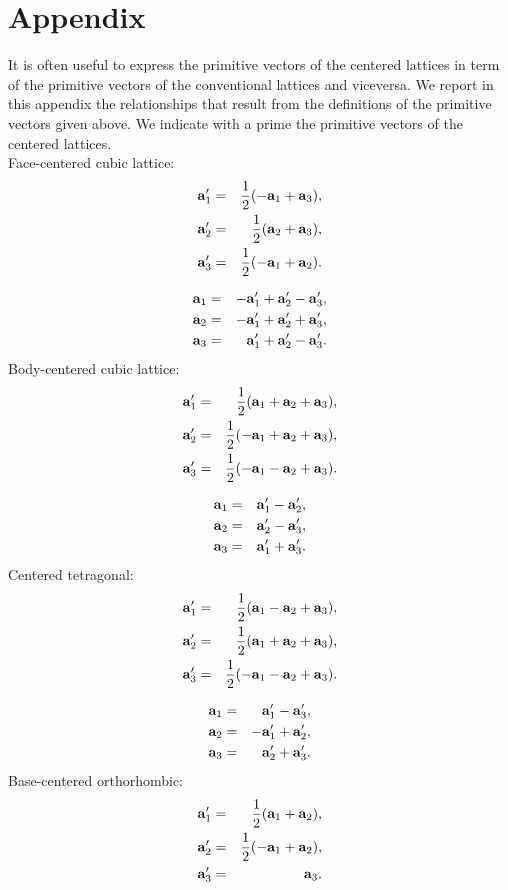 \documentclass[12pt,a4paper]{article}
\begin{document}
\newpage
\section{\color{coral}Appendix}
It is often useful to express the primitive vectors of the centered
lattices in term of the primitive vectors of the conventional lattices
and viceversa. We report in this appendix the relationships that result
from the definitions of the primitive vectors given above.
We indicate with a prime the primitive vectors of the centered lattices. \\
Face-centered cubic lattice:
\begin{eqnarray}
{\bf a}_1'&=&{1\over 2} (-{\bf a}_1 + {\bf a}_3), \\
{\bf a}_2'&=&{1\over 2} ({\bf a}_2 + {\bf a}_3), \\
{\bf a}_3'&=&{1\over 2} (-{\bf a}_1 + {\bf a}_2). 
\end{eqnarray}

\begin{eqnarray}
{\bf a}_1&=& -{\bf a}_1' + {\bf a}_2'- {\bf a}_3', \\
{\bf a}_2&=& -{\bf a}_1' + {\bf a}_2'+ {\bf a}_3', \\
{\bf a}_3&=& {\bf a}_1' + {\bf a}_2'- {\bf a}_3' .
\end{eqnarray}
Body-centered cubic lattice:
\begin{eqnarray}
{\bf a}_1'&=&{1\over 2} ({\bf a}_1 + {\bf a}_2 + {\bf a}_3), \\
{\bf a}_2'&=&{1\over 2} (-{\bf a}_1 + {\bf a}_2 + {\bf a}_3), \\
{\bf a}_3'&=&{1\over 2} (-{\bf a}_1 - {\bf a}_2 + {\bf a}_3). 
\end{eqnarray}

\begin{eqnarray}
{\bf a}_1&=&  {\bf a}_1' - {\bf a}_2', \\
{\bf a}_2&=&  {\bf a}_2' - {\bf a}_3', \\
{\bf a}_3&=& {\bf a}_1' + {\bf a}_3'.
\end{eqnarray}
Centered tetragonal:
\begin{eqnarray}
{\bf a}_1'&=&{1\over 2} ({\bf a}_1 - {\bf a}_2 + {\bf a}_3), \\
{\bf a}_2'&=&{1\over 2} ({\bf a}_1 + {\bf a}_2 + {\bf a}_3), \\
{\bf a}_3'&=&{1\over 2} (-{\bf a}_1 - {\bf a}_2 + {\bf a}_3). 
\end{eqnarray}

\begin{eqnarray}
{\bf a}_1&=&  {\bf a}_1' - {\bf a}_3', \\
{\bf a}_2&=& -{\bf a}_1' + {\bf a}_2', \\
{\bf a}_3&=& {\bf a}_2' + {\bf a}_3'.
\end{eqnarray}
Base-centered orthorhombic:
\begin{eqnarray}
{\bf a}_1'&=&{1\over 2} ({\bf a}_1 + {\bf a}_2), \\
{\bf a}_2'&=&{1\over 2} (-{\bf a}_1 + {\bf a}_2), \\
{\bf a}_3'&=&{\bf a}_3. 
\end{eqnarray}
\end{document}
